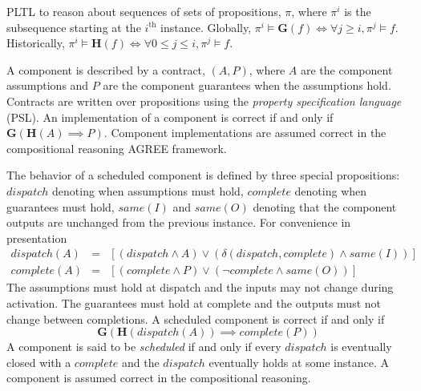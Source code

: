 
\newcommand{\globally}{\ensuremath{\mathbf{G}}}
\newcommand{\historically}{\ensuremath{\mathbf{H}}}
\newcommand{\assumes}{\ensuremath{A}}
\newcommand{\guarantees}{\ensuremath{P}}
\newcommand{\dispatch}{\ensuremath{\mathit{dispatch}}}
\newcommand{\complete}{\ensuremath{\mathit{complete}}}
\newcommand{\same}[1]{\ensuremath{\mathit{same}(#1)}}
\newcommand{\inputs}{\ensuremath{I}}
\newcommand{\outputs}{\ensuremath{O}}
\newcommand{\system}{\ensuremath{S}}
\newcommand{\components}{\ensuremath{C}}
\newcommand{\schedule}{\ensuremath{\phi}}
\newcommand{\valid}{\ensuremath{\mathit{valid}}}

PLTL to reason about sequences of sets of propositions, $\pi$, where $\pi^i$ is the subsequence starting at the $i^\mathrm{th}$ instance.
Globally, $\pi^i \models \globally(f) \iff \forall j \ge i, \pi^j \models f$.
Historically, $\pi^i \models \historically(f) \iff \forall 0 \le j \le i, \pi^j \models f$.

A component is described by a contract, $(\assumes, \guarantees)$, where $\assumes$ are the component assumptions and $\guarantees$ are the component guarantees when the assumptions hold.
Contracts are written over propositions using the \emph{property specification language} (PSL).
An implementation of a component is correct if and only if $\globally(\historically(\assumes) \implies \guarantees)$.
Component implementations are assumed correct in the compositional reasoning AGREE framework.

The behavior of a scheduled component is defined by three special propositions: $\dispatch$ denoting when assumptions must hold, $\complete$ denoting when guarantees must hold, $\same{\inputs}$ and $\same{\outputs}$ denoting that the component outputs are unchanged from the previous instance. For convenience in presentation
\begin{eqnarray*}
  \dispatch(A) &=& \left[\left(\dispatch \wedge \assumes\right) \vee \left(\delta(\dispatch, \complete) \wedge \same{\inputs}\right)\right] \\
  \complete(A) &=& \left[\left(\complete \wedge \guarantees\right) \vee \left(\neg\complete \wedge \same{\outputs}\right)\right]
\end{eqnarray*}
The assumptions must hold at dispatch and the inputs may not change during activation.
The guarantees must hold at complete and the outputs must not change between completions.
A scheduled component is correct if and only if
\[
  \globally\left(
    \historically\left(\dispatch(\assumes)\right) \implies \complete(\guarantees) \right)
\]
A component is said to be \emph{scheduled} if and only if every $\dispatch$ is eventually closed with a $\complete$ and the $\dispatch$ eventually holds at some instance.
A component is assumed correct in the compositional reasoning.

